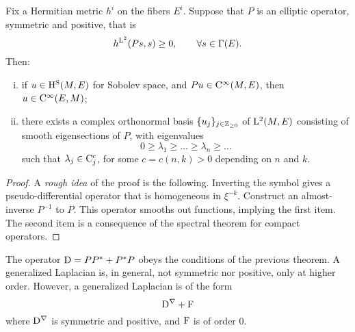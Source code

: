 \begin{theorem}
  Fix a Hermitian metric $h^i$ on the fibers $E^i$.
  Suppose that $P$ is an elliptic operator, symmetric and positive, that is
  \begin{equation*}
    h^{\mathrm{L}^2}(P s, s) \geq 0, \qquad \forall s \in \Gamma(E).
  \end{equation*}
  Then:
  \begin{enumerate}[i)]
    \item if $u \in \mathrm{H}^{\mathrm{S}} (M, E)$ for Sobolev space, and $P u \in \mathrm{C}^\infty (M, E)$, then $u \in \mathrm{C}^\infty(E, M)$;
    \item there exists a complex orthonormal basis $\{ u_j \}_{j \in \mathbb{Z}_{\geq 0}}$ of $\mathrm{L}^2 (M, E)$ consisting of smooth eigensections of $P$, with eigenvalues
      \begin{equation*}
        0 \geq \lambda_1 \geq \dots \geq \lambda_n \geq \dots
      \end{equation*}
      such that $\lambda_j \in \mathrm{C}_j^c$, for some $c = c(n, k) > 0$ depending on $n$ and $k$.
  \end{enumerate}
\end{theorem}

\begin{proof}
  A \textit{rough idea} of the proof is the following. Inverting the symbol gives a pseudo-differential operator that is homogeneous in $\xi^{-k}$.
  Construct an almost-inverse $P^{-1}$ to $P$.
  This operator smooths out functions, implying the first item.
  The second item is a consequence of the spectral theorem for compact operators.
\end{proof}

The operator $\mathrm{D} = P P^* + P^* P$ obeys the conditions of the previous theorem.
A generalized Laplacian is, in general, not symmetric nor positive, only at higher order.
However, a generalized Laplacian is of the form
\begin{equation*}
  \mathrm{D}^\nabla + \mathrm{F}
\end{equation*}
where $\mathrm{D}^\nabla$ is symmetric and positive, and $\mathrm{F}$ is of order $0$.
